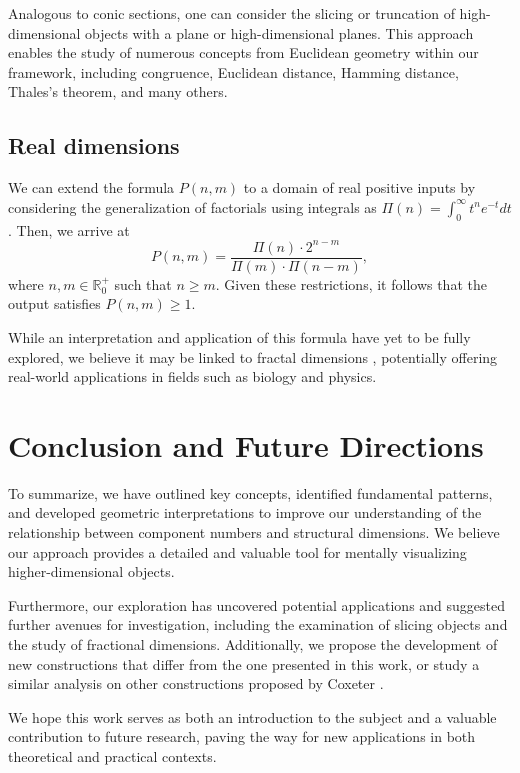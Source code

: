 \documentclass{article}
\begin{document}
	Analogous to conic sections, one can consider the slicing or truncation of high-dimensional objects \cite{coxeter1973regular} with a plane or high-dimensional planes. This approach enables the study of numerous concepts from Euclidean geometry \cite{euclid} within our framework, including congruence, Euclidean distance, Hamming distance, Thales's theorem, and many others.
	
	
	\subsection{Real dimensions}
	
	We can extend the formula $P(n,m)$ to a domain of real positive inputs by considering the generalization of factorials using integrals as $\Pi(n)=\int_{0}^{\infty} t^n e^{-t} dt$ \cite{rice2007}. Then, we arrive at $$P(n,m)=\frac{\Pi(n) \cdot 2^{n-m}}{\Pi(m) \cdot \Pi(n-m)},$$
	where $n,m \in \mathbb{R}^{+}_{0}$ such that $n\geq m$. Given these restrictions, it follows that the output satisfies $P(n,m) \geq 1$. 
	
	While an interpretation and application of this formula have yet to be fully explored, we believe it may be linked to fractal dimensions \cite{fractionalDim}, potentially offering real-world applications in fields such as biology and physics.

	
	\section{Conclusion and Future Directions \label{sec:conclusion}}
	
	To summarize, we have outlined key concepts, identified fundamental patterns, and developed geometric interpretations to improve our understanding of the relationship between component numbers and structural dimensions. We believe our approach provides a detailed and valuable tool for mentally visualizing higher-dimensional objects.
	
	Furthermore, our exploration has uncovered potential applications and suggested further avenues for investigation, including the examination of slicing objects and the study of fractional dimensions. Additionally, we propose the development of new constructions that differ from the one presented in this work, or study a similar analysis on other constructions proposed by Coxeter \cite{coxeter1973regular}.
	
	We hope this work serves as both an introduction to the subject and a valuable contribution to future research, paving the way for new applications in both theoretical and practical contexts.
	
\end{document}
